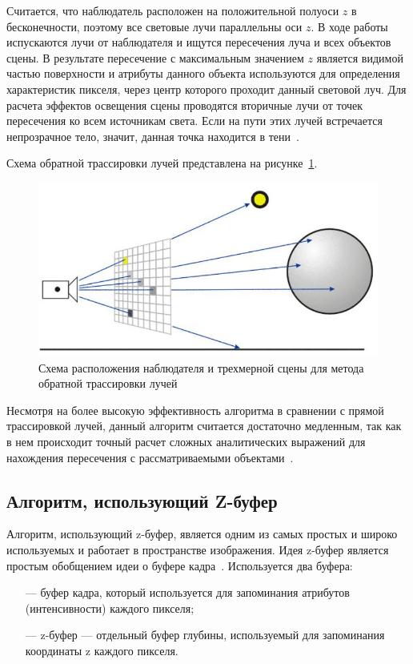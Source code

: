 \documentclass[a4paper, 14pt]{extreport}
\begin{document}
Считается, что наблюдатель расположен на положительной полуоси $z$ в бесконечности, поэтому все световые лучи 
параллельны оси $z$. В ходе работы испускаются лучи от наблюдателя и ищутся пересечения луча и всех объектов сцены. 
В результате пересечение с максимальным значением $z$ является видимой частью поверхности и атрибуты данного объекта 
используются для определения характеристик пикселя, через центр которого проходит данный световой луч.
Для расчета эффектов освещения сцены проводятся вторичные лучи от точек пересечения ко всем источникам света. Если на 
пути этих лучей встречается непрозрачное тело, значит, данная точка находится в тени~\cite{rodjers}.

Схема обратной трассировки лучей представлена на рисунке~\ref{analytic:back-tracing}.

\begin{figure}[h]
	\centering
	\includegraphics[scale=0.9]{tools/back-tracing.png}
	\caption{Схема расположения наблюдателя и трехмерной сцены для метода обратной трассировки лучей}
	\label{analytic:back-tracing}
\end{figure}

Несмотря на более высокую эффективность алгоритма в сравнении с прямой трассировкой лучей, данный алгоритм считается 
достаточно медленным, так как в нем происходит точный расчет сложных аналитических выражений для нахождения 
пересечения с рассматриваемыми объектами~\cite{eromin}.

\subsection{Алгоритм, использующий Z-буфер}

Алгоритм, использующий z-буфер, является одним из самых простых и широко используемых и работает в пространстве 
изображения. Идея z-буфер является простым обобщением идеи о буфере кадра~\cite{rodjers}. Используется два буфера:
\begin{itemize}
	\item[---] буфер кадра, который используется для запоминания атрибутов (интенсивности) каждого пикселя;
	\item[---] z-буфер --- отдельный буфер глубины, используемый для запоминания координаты z каждого пикселя.
\end{itemize}
\end{document}
